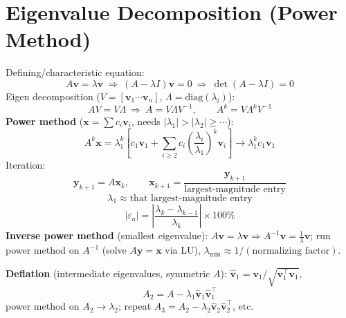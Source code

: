 \section{Eigenvalue Decomposition (Power Method)}

\begin{formulabox}
Defining/characteristic equation:
\[
A\mathbf v = \lambda\mathbf v \ \Rightarrow\ (A-\lambda I)\mathbf v = 0 \ \Rightarrow\ \det(A-\lambda I)=0
\]
Eigen decomposition ($V=[\mathbf v_1\cdots\mathbf v_n]$, $\Lambda=\mathrm{diag}(\lambda_i)$):
\[
AV = V\Lambda \ \Rightarrow\ A = V\Lambda V^{-1}, \qquad A^k = V\Lambda^k V^{-1}
\]
\textbf{Power method} ($\mathbf x=\sum c_i\mathbf v_i$, needs $|\lambda_1|>|\lambda_2|\ge\cdots$):
\[
A^k\mathbf x = \lambda_1^k\left[c_1\mathbf v_1 + \sum_{i\ge2} c_i\left(\frac{\lambda_i}{\lambda_1}\right)^k\mathbf v_i\right] \to \lambda_1^k c_1\mathbf v_1
\]
Iteration:
\[
\mathbf y_{k+1}=A\mathbf x_k, \qquad \mathbf x_{k+1} = \frac{\mathbf y_{k+1}}{\text{largest-magnitude entry}}
\]
\[
\lambda_1\approx\text{that largest-magnitude entry}
\]
\[
|\varepsilon_a| = \left|\frac{\lambda_k-\lambda_{k-1}}{\lambda_k}\right|\times100\%
\]
\textbf{Inverse power method} (smallest eigenvalue): $A\mathbf v=\lambda\mathbf v \Rightarrow A^{-1}\mathbf v = \tfrac1\lambda\mathbf v$; run power method on $A^{-1}$ (solve $A\mathbf y=\mathbf x$ via LU), $\lambda_{\min}\approx1/(\text{normalizing factor})$.

\textbf{Deflation} (intermediate eigenvalues, symmetric $A$): $\hat{\mathbf v}_1=\mathbf v_1/\sqrt{\mathbf v_1^\top\mathbf v_1}$,
\[
A_2 = A - \lambda_1\hat{\mathbf v}_1\hat{\mathbf v}_1^\top
\]
power method on $A_2\to\lambda_2$; repeat $A_3=A_2-\lambda_2\hat{\mathbf v}_2\hat{\mathbf v}_2^\top$, etc.
\end{formulabox}
